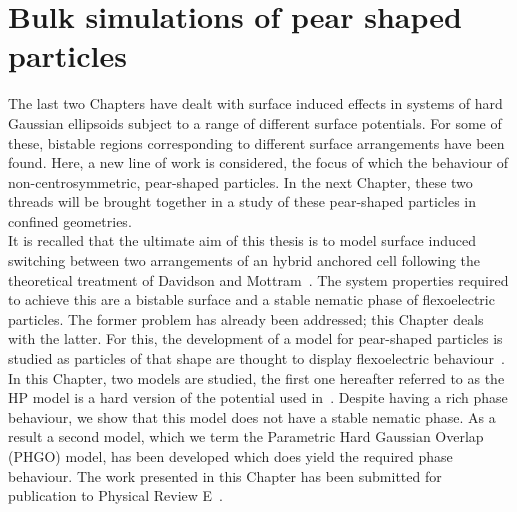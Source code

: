 

\chapter{Bulk simulations of pear shaped particles}
\label{chap:six}

\introduction

The last two Chapters have dealt with surface induced effects in systems of hard Gaussian 
ellipsoids subject to a range of different surface potentials. For some of these, bistable regions 
corresponding to different surface arrangements have been found. Here, a new line of work is
considered, the focus of which the behaviour of non-centrosymmetric, pear-shaped particles.
In the next Chapter, these two threads will be brought together in a study of these pear-shaped
particles in confined geometries.\\
It is recalled that the ultimate aim of this thesis is to model surface induced switching between
two arrangements of an hybrid anchored cell following the theoretical
treatment of Davidson and Mottram~\cite{DavidsonMottram02}. The system properties required
to achieve this 
are a bistable surface and a stable nematic phase of flexoelectric particles. The former problem
has already been addressed; this Chapter deals with the latter. For this, the development of a
model for pear-shaped particles is studied as particles of that shape are thought to display 
flexoelectric behaviour~\cite{Meyer69}.\\
In this Chapter, two models are studied, the first one hereafter referred to as the HP model is a
hard version of the potential  used in~\cite{BerardiRicci01}. Despite having a rich phase
behaviour, 
we show that this model does not have a stable nematic phase. As a result a second model,
which we term the Parametric Hard Gaussian Overlap (PHGO) model, has been developed which does
yield the required phase behaviour. The work presented 
in this Chapter has been submitted for publication to Physical Review E~\cite{BarmesRicci03}.







